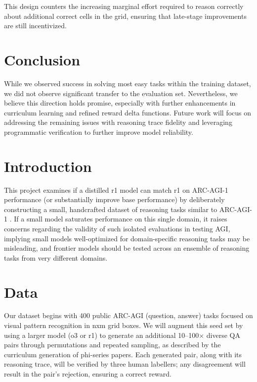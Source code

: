 \documentclass{article}
\begin{document}
This design counters the increasing marginal effort required to reason correctly about additional correct cells in the grid, ensuring that late-stage improvements are still incentivized.

\section{Conclusion}

While we observed success in solving most easy tasks within the training dataset, we did not observe significant transfer to the evaluation set. Nevertheless, we believe this direction holds promise, especially with further enhancements in curriculum learning and refined reward delta functions. Future work will focus on addressing the remaining issues with reasoning trace fidelity and leveraging programmatic verification to further improve model reliability.



\section{Introduction}
This project examines if a distilled r1 model can match r1 on ARC-AGI-1 performance (or substantially improve base performance) by deliberately constructing a small, handcrafted dataset of reasoning tasks similar to ARC-AGI-1 \cite{ARC-AGI, r1}. If a small model saturates performance on this single domain, it raises concerns regarding the validity of such isolated evaluations in testing AGI, implying small models well-optimized for domain-specific reasoning tasks may be misleading, and frontier models should be tested across an ensemble of reasoning tasks from very different domains.

\section{Data}
Our dataset begins with 400 public ARC-AGI (question, answer) tasks focused on visual pattern recognition in nxm grid boxes. We will augment this seed set by using a larger model (o3 or r1) to generate an additional 10--100$\times$ diverse QA pairs through permutations and repeated sampling, as described by the curriculum generation of phi-series papers. Each generated pair, along with its reasoning trace, will be verified by three human labellers; any disagreement will result in the pair's rejection, ensuring a correct reward.
\end{document}
